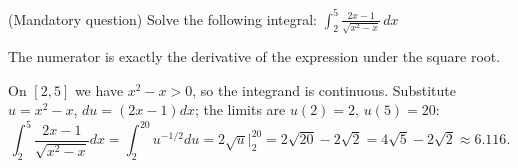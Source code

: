 
\begin{question}
(Mandatory question)
Solve the following integral:
$\displaystyle\int_2^5\frac{2x-1}{\sqrt{x^2-x}}\,dx$
\end{question}

\begin{hint}
The numerator is exactly the derivative of the expression under the square root.
\end{hint}

\begin{solution}
On $[2,5]$ we have $x^2-x>0$, so the integrand is continuous. Substitute $u=x^2-x$, $du=(2x-1)dx$; the limits are $u(2)=2$, $u(5)=20$:
\[ \int_2^5\frac{2x-1}{\sqrt{x^2-x}}dx=\int_2^{20}u^{-1/2}du=2\sqrt u\Big|_2^{20}=2\sqrt{20}-2\sqrt2=\boxed{4\sqrt5-2\sqrt2}\approx 6.116. \]
\end{solution}
